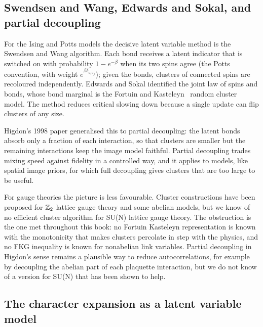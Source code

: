 \subsection{Swendsen and Wang, Edwards and Sokal, and partial decoupling}

For the Ising and Potts models the decisive latent variable method is the Swendsen and Wang algorithm. Each bond receives a latent indicator that is switched on with probability $1-e^{-\beta}$ when its two spins agree (the Potts convention, with weight $e^{\beta\delta_{\sigma_i\sigma_j}}$); given the bonds, clusters of connected spins are recoloured independently. Edwards and Sokal identified the joint law of spins and bonds, whose bond marginal is the Fortuin and Kasteleyn~\cite{FK72} random cluster model. The method reduces critical slowing down because a single update can flip clusters of any size.

Higdon's 1998 paper generalised this to partial decoupling: the latent bonds absorb only a fraction of each interaction, so that clusters are smaller but the remaining interactions keep the image model faithful. Partial decoupling trades mixing speed against fidelity in a controlled way, and it applies to models, like spatial image priors, for which full decoupling gives clusters that are too large to be useful.

For gauge theories the picture is less favourable. Cluster constructions have been proposed for $\mathbb{Z}_2$ lattice gauge theory and some abelian models, but we know of no efficient cluster algorithm for SU(N) lattice gauge theory. The obstruction is the one met throughout this book: no Fortuin Kasteleyn representation is known with the monotonicity that makes clusters percolate in step with the physics, and no FKG inequality is known for nonabelian link variables. Partial decoupling in Higdon's sense remains a plausible way to reduce autocorrelations, for example by decoupling the abelian part of each plaquette interaction, but we do not know of a version for SU(N) that has been shown to help.

\subsection{The character expansion as a latent variable model}

